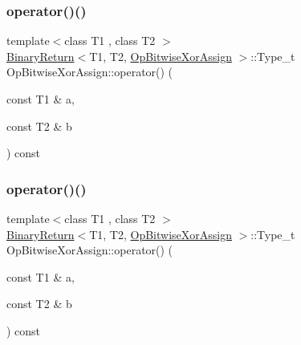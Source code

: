 \subsubsection{\texorpdfstring{operator()()}{operator()()}\hspace{0.1cm}{\footnotesize\ttfamily [1/3]}}
{\footnotesize\ttfamily template$<$class T1 , class T2 $>$ \\
\mbox{\hyperlink{structBinaryReturn}{Binary\+Return}}$<$T1, T2, \mbox{\hyperlink{structOpBitwiseXorAssign}{Op\+Bitwise\+Xor\+Assign}} $>$\+::Type\+\_\+t Op\+Bitwise\+Xor\+Assign\+::operator() (\begin{DoxyParamCaption}\item[{const T1 \&}]{a,  }\item[{const T2 \&}]{b }\end{DoxyParamCaption}) const\hspace{0.3cm}{\ttfamily [inline]}}

\mbox{\label{structOpBitwiseXorAssign_a09ad5519029abdca1ad159742ed8ed89}} 
\subsubsection{\texorpdfstring{operator()()}{operator()()}\hspace{0.1cm}{\footnotesize\ttfamily [2/3]}}
{\footnotesize\ttfamily template$<$class T1 , class T2 $>$ \\
\mbox{\hyperlink{structBinaryReturn}{Binary\+Return}}$<$T1, T2, \mbox{\hyperlink{structOpBitwiseXorAssign}{Op\+Bitwise\+Xor\+Assign}} $>$\+::Type\+\_\+t Op\+Bitwise\+Xor\+Assign\+::operator() (\begin{DoxyParamCaption}\item[{const T1 \&}]{a,  }\item[{const T2 \&}]{b }\end{DoxyParamCaption}) const\hspace{0.3cm}{\ttfamily [inline]}}

\mbox{\label{structOpBitwiseXorAssign_a09ad5519029abdca1ad159742ed8ed89}} 
